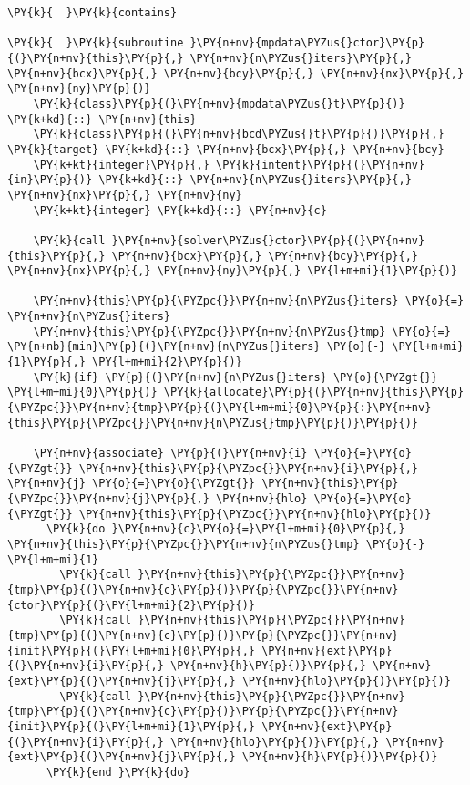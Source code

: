 \begin{Verbatim}[commandchars=\\\{\}]
\PY{k}{  }\PY{k}{contains}

\PY{k}{  }\PY{k}{subroutine }\PY{n+nv}{mpdata\PYZus{}ctor}\PY{p}{(}\PY{n+nv}{this}\PY{p}{,} \PY{n+nv}{n\PYZus{}iters}\PY{p}{,} \PY{n+nv}{bcx}\PY{p}{,} \PY{n+nv}{bcy}\PY{p}{,} \PY{n+nv}{nx}\PY{p}{,} \PY{n+nv}{ny}\PY{p}{)}
    \PY{k}{class}\PY{p}{(}\PY{n+nv}{mpdata\PYZus{}t}\PY{p}{)} \PY{k+kd}{::} \PY{n+nv}{this}
    \PY{k}{class}\PY{p}{(}\PY{n+nv}{bcd\PYZus{}t}\PY{p}{)}\PY{p}{,} \PY{k}{target} \PY{k+kd}{::} \PY{n+nv}{bcx}\PY{p}{,} \PY{n+nv}{bcy}
    \PY{k+kt}{integer}\PY{p}{,} \PY{k}{intent}\PY{p}{(}\PY{n+nv}{in}\PY{p}{)} \PY{k+kd}{::} \PY{n+nv}{n\PYZus{}iters}\PY{p}{,} \PY{n+nv}{nx}\PY{p}{,} \PY{n+nv}{ny}
    \PY{k+kt}{integer} \PY{k+kd}{::} \PY{n+nv}{c}

    \PY{k}{call }\PY{n+nv}{solver\PYZus{}ctor}\PY{p}{(}\PY{n+nv}{this}\PY{p}{,} \PY{n+nv}{bcx}\PY{p}{,} \PY{n+nv}{bcy}\PY{p}{,} \PY{n+nv}{nx}\PY{p}{,} \PY{n+nv}{ny}\PY{p}{,} \PY{l+m+mi}{1}\PY{p}{)}

    \PY{n+nv}{this}\PY{p}{\PYZpc{}}\PY{n+nv}{n\PYZus{}iters} \PY{o}{=} \PY{n+nv}{n\PYZus{}iters}
    \PY{n+nv}{this}\PY{p}{\PYZpc{}}\PY{n+nv}{n\PYZus{}tmp} \PY{o}{=} \PY{n+nb}{min}\PY{p}{(}\PY{n+nv}{n\PYZus{}iters} \PY{o}{-} \PY{l+m+mi}{1}\PY{p}{,} \PY{l+m+mi}{2}\PY{p}{)}
    \PY{k}{if} \PY{p}{(}\PY{n+nv}{n\PYZus{}iters} \PY{o}{\PYZgt{}} \PY{l+m+mi}{0}\PY{p}{)} \PY{k}{allocate}\PY{p}{(}\PY{n+nv}{this}\PY{p}{\PYZpc{}}\PY{n+nv}{tmp}\PY{p}{(}\PY{l+m+mi}{0}\PY{p}{:}\PY{n+nv}{this}\PY{p}{\PYZpc{}}\PY{n+nv}{n\PYZus{}tmp}\PY{p}{)}\PY{p}{)} 

    \PY{n+nv}{associate} \PY{p}{(}\PY{n+nv}{i} \PY{o}{=}\PY{o}{\PYZgt{}} \PY{n+nv}{this}\PY{p}{\PYZpc{}}\PY{n+nv}{i}\PY{p}{,} \PY{n+nv}{j} \PY{o}{=}\PY{o}{\PYZgt{}} \PY{n+nv}{this}\PY{p}{\PYZpc{}}\PY{n+nv}{j}\PY{p}{,} \PY{n+nv}{hlo} \PY{o}{=}\PY{o}{\PYZgt{}} \PY{n+nv}{this}\PY{p}{\PYZpc{}}\PY{n+nv}{hlo}\PY{p}{)}
      \PY{k}{do }\PY{n+nv}{c}\PY{o}{=}\PY{l+m+mi}{0}\PY{p}{,} \PY{n+nv}{this}\PY{p}{\PYZpc{}}\PY{n+nv}{n\PYZus{}tmp} \PY{o}{-} \PY{l+m+mi}{1}
        \PY{k}{call }\PY{n+nv}{this}\PY{p}{\PYZpc{}}\PY{n+nv}{tmp}\PY{p}{(}\PY{n+nv}{c}\PY{p}{)}\PY{p}{\PYZpc{}}\PY{n+nv}{ctor}\PY{p}{(}\PY{l+m+mi}{2}\PY{p}{)}
        \PY{k}{call }\PY{n+nv}{this}\PY{p}{\PYZpc{}}\PY{n+nv}{tmp}\PY{p}{(}\PY{n+nv}{c}\PY{p}{)}\PY{p}{\PYZpc{}}\PY{n+nv}{init}\PY{p}{(}\PY{l+m+mi}{0}\PY{p}{,} \PY{n+nv}{ext}\PY{p}{(}\PY{n+nv}{i}\PY{p}{,} \PY{n+nv}{h}\PY{p}{)}\PY{p}{,} \PY{n+nv}{ext}\PY{p}{(}\PY{n+nv}{j}\PY{p}{,} \PY{n+nv}{hlo}\PY{p}{)}\PY{p}{)}
        \PY{k}{call }\PY{n+nv}{this}\PY{p}{\PYZpc{}}\PY{n+nv}{tmp}\PY{p}{(}\PY{n+nv}{c}\PY{p}{)}\PY{p}{\PYZpc{}}\PY{n+nv}{init}\PY{p}{(}\PY{l+m+mi}{1}\PY{p}{,} \PY{n+nv}{ext}\PY{p}{(}\PY{n+nv}{i}\PY{p}{,} \PY{n+nv}{hlo}\PY{p}{)}\PY{p}{,} \PY{n+nv}{ext}\PY{p}{(}\PY{n+nv}{j}\PY{p}{,} \PY{n+nv}{h}\PY{p}{)}\PY{p}{)}
      \PY{k}{end }\PY{k}{do}


\end{Verbatim}
